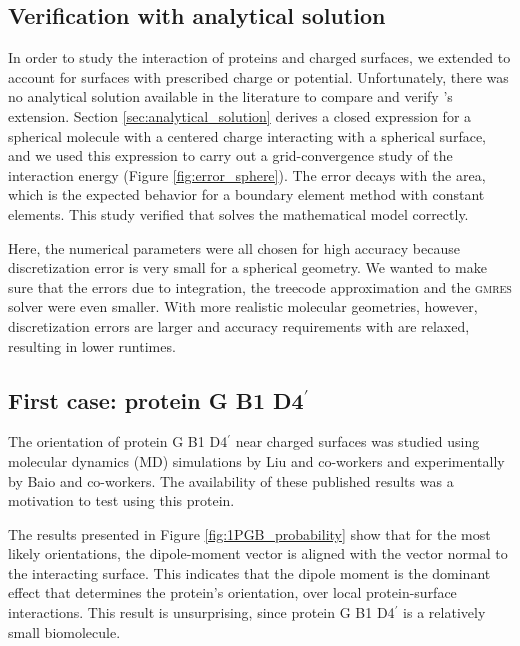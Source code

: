 
\subsection{Verification with analytical solution} \label{sec:disc_analytical}
In order to study the interaction of proteins and charged surfaces, we extended \pygbe to account for surfaces with prescribed charge or potential. Unfortunately, there was no analytical solution available in the literature to compare and verify \pygbe's extension. Section \ref{sec:analytical_solution} derives a closed expression for a spherical molecule with a centered charge interacting with a spherical surface, and we used this expression to carry out a grid-convergence study of the interaction energy (Figure \ref{fig:error_sphere}). The error decays with the area, which is the expected behavior \cite{CooperBardhanBarba2013, CooperBarba-share154331} for a boundary element method with constant elements. This study verified that \pygbe solves the mathematical model correctly.

Here, the numerical parameters were all chosen for high accuracy because  discretization error is very small for a spherical geometry. We wanted to make sure that the errors due to integration, the treecode approximation and the \textsc{gmres} solver were even smaller. With more realistic molecular geometries, however, discretization errors are larger and accuracy requirements with \pygbe are relaxed, resulting in lower runtimes.

\subsection{First case: protein G B1 D4$^\prime$} \label{sec:disc_1PGB}

The orientation of protein G B1 D4$^\prime$ near charged surfaces was studied using molecular dynamics (MD) simulations by Liu and co-workers\cite{LiuLiaoZhou2013} and  experimentally by Baio and co-workers.\cite{BaioWeidnerBaughGambleStaytonCastner2012} The availability of these published results was a motivation to test \pygbe using this protein. 

The results presented in Figure \ref{fig:1PGB_probability} show that for the most likely orientations, the dipole-moment vector is aligned with the vector normal to the interacting surface. This indicates that the dipole moment is the dominant effect that determines the protein's orientation, over local protein-surface  interactions. This result is unsurprising, since protein G B1 D4$^\prime$ is a relatively small biomolecule. 

